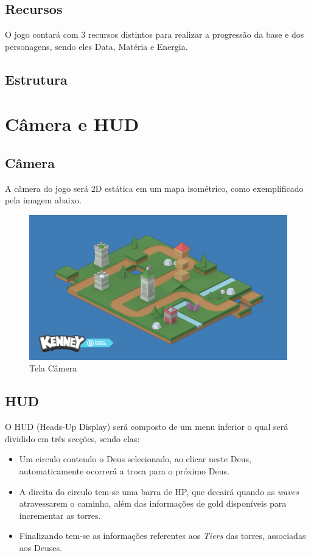 \documentclass[11pt]{article} %
\begin{document}
\subsection{Recursos}

O jogo contará com 3 recursos distintos para realizar a progressão da base e dos personagens, sendo eles Data, Matéria e Energia.

\subsection{Estrutura}

\newpage

\section{Câmera e HUD}

\subsection{Câmera}

A câmera do jogo será 2D estática em um mapa isométrico, como exemplificado pela imagem abaixo.
\begin{figure}[!htp]
\centering
\includegraphics[scale=0.25]{res/map_example.png}
\caption{Tela Câmera}
\label{Tela Barracks}
\end{figure}

\subsection{HUD}

O HUD (Heads-Up Display) será composto de um menu inferior o qual será dividido em três secções, sendo elas:
\begin{itemize}
\item Um circulo contendo o Deus selecionado, ao clicar neste Deus, automaticamente ocorrerá a troca para o próximo Deus.
\item A direita do circulo tem-se uma barra de HP, que decairá quando as \textit{waves} atravessarem o caminho, além das informações de gold disponíveis para incrementar as torres.
\item Finalizando tem-se as informações referentes aos \textit{Tiers} das torres, associadas aos Deuses.
\end{itemize}
\end{document}
